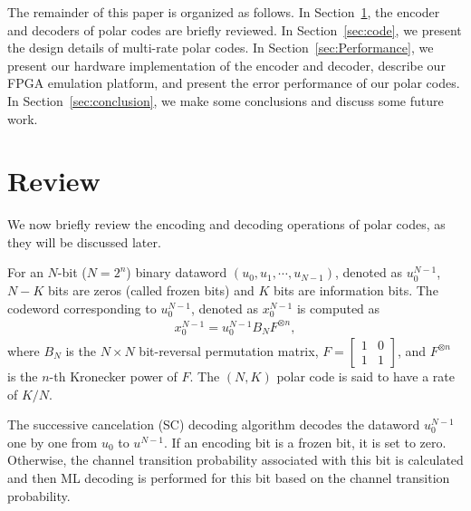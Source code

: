 \documentclass{article}
\begin{document}
	
	The remainder of this paper is organized as follows. In Section~\ref{sec:review}, the encoder and decoders of polar codes are briefly reviewed.  In Section~\ref{sec:code}, we present the design details of multi-rate polar codes. In Section~\ref{sec:Performance}, we present our hardware implementation of the encoder and decoder, describe our FPGA emulation platform, and present the error performance of our polar codes. In Section~\ref{sec:conclusion}, we make some conclusions and discuss some future work.


\section{Review}
\label{sec:review}

We now briefly review the encoding and decoding operations of polar codes, as they will be discussed later.

For an $N$-bit ($N=2^n$) binary dataword $(u_0, u_1,\cdots,u_{N-1})$, denoted as $u^{N-1}_0$, $N-K$ bits are zeros (called frozen bits) and $K$ bits are information bits. The codeword corresponding to $u^{N-1}_0$, denoted as $x^{N-1}_0$ is computed as 
\begin{equation}
\begin{array}{l}
     x^{N-1}_0 =  u^{N-1}_0B_NF^{\otimes n},
\end{array}\label{eq:encoding}
\end{equation}
where  $B_N$ is the $N\times N$ bit-reversal permutation matrix, $F=\left[
\begin{smallmatrix}
1 & 0 \\
1 & 1
\end{smallmatrix}
\right]$, and $F^{\otimes
  n}$ is the $n$-th Kronecker power of $F$. The  $(N, K)$ polar code is said to have a rate of $K/N$.

The successive cancelation (SC) decoding algorithm \cite{arikan2009channel} decodes the dataword
 $u^{N-1}_0$ one by one from $u_0$ to $u^{N-1}$. If an encoding bit is a frozen bit,
it is set to zero. Otherwise, the channel transition probability associated with
this bit is calculated and then ML decoding is performed for this bit based on
the channel transition probability.
\end{document}
